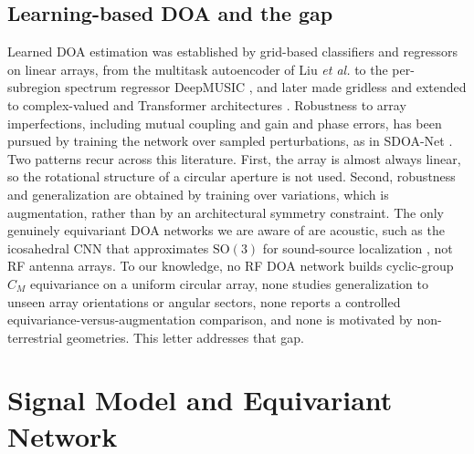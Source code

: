 \documentclass[conference]{IEEEtran}
\begin{document}
\subsection{Learning-based DOA and the gap}
Learned DOA estimation was established by grid-based classifiers and regressors on
linear arrays, from the multitask autoencoder of Liu \emph{et al.} \cite{liu2018}
to the per-subregion spectrum regressor DeepMUSIC \cite{elbir2020}, and later made
gridless and extended to complex-valued and Transformer architectures
\cite{wu2022,tan2023,guo2024}. Robustness to array imperfections, including mutual
coupling and gain and phase errors, has been pursued by training the network over
sampled perturbations, as in SDOA-Net \cite{sdoanet2024}. Two patterns recur across this literature. First, the array is
almost always linear, so the rotational structure of a circular aperture is not
used. Second, robustness and generalization are obtained by training over
variations, which is augmentation, rather than by an architectural symmetry
constraint. The only genuinely equivariant DOA networks we are aware of are
acoustic, such as the icosahedral CNN that approximates $\mathrm{SO}(3)$ for
sound-source localization \cite{diazguerra2023}, not RF antenna arrays. To our
knowledge, no RF DOA network builds cyclic-group $C_M$ equivariance on a uniform
circular array, none studies generalization to unseen array orientations or angular
sectors, none reports a controlled equivariance-versus-augmentation comparison, and
none is motivated by non-terrestrial geometries. This letter addresses that gap.

\section{Signal Model and Equivariant Network}
\end{document}
